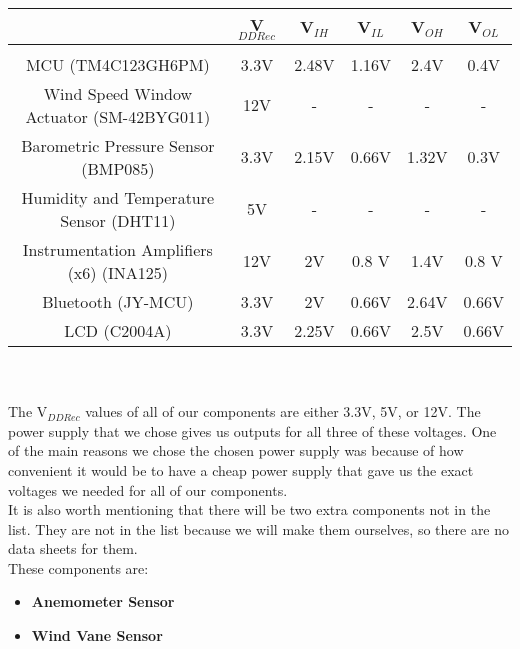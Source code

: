 
			\begin{tabular}{|c|c|c|c|c|c|}
				\hline
					& V$_{DD Rec}$ & V$_{IH}$ & V$_{IL}$ & V$_{OH}$ & V$_{OL}$ \\
				\hline
					& & & & &  \\
					MCU (TM4C123GH6PM) & 3.3V & 2.48V & 1.16V & 2.4V & 0.4V \\
					Wind Speed Window Actuator (SM-42BYG011) & 12V & - & - & - & - \\
					Barometric Pressure Sensor (BMP085) & 3.3V & 2.15V & 0.66V & 1.32V & 0.3V \\
					Humidity and Temperature Sensor (DHT11)& 5V & - & - & - & - \\
					Instrumentation Amplifiers (x6) (INA125) & 12V & 2V & 0.8 V & 1.4V & 0.8 V\\
					Bluetooth (JY-MCU) & 3.3V & 2V & 0.66V  & 2.64V & 0.66V \\
					LCD (C2004A) & 3.3V & 2.25V & 0.66V & 2.5V & 0.66V \\
				\hline
			\end{tabular} \\ \\

			The V$_{DD Rec}$ values of all of our components are either 3.3V, 5V, or 12V. The power supply that we chose gives us outputs for all three of these voltages. One of the main reasons we chose the chosen power supply was because of how convenient it would be to have a cheap power supply that gave us the exact voltages we needed for all of our components. \\

			It is also worth mentioning that there will be two extra components not in the list. They are not in the list because we will make them ourselves, so there are no data sheets for them. \\ 

			These components are: 
			\begin{itemize}
			  \item \textbf{Anemometer Sensor}
			  \item \textbf{Wind Vane Sensor}
			\end{itemize}  

